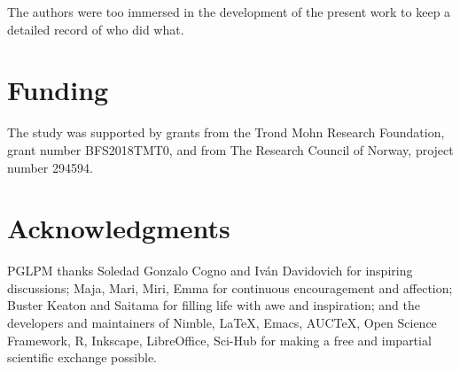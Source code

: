 \documentclass[utf8]{FrontiersinHarvard} %
\providecommand{\href}[2]{#2}
\renewcommand*{\|}[1][]{\nonscript\:#1\vert\nonscript\:\mathopen{}}
\begin{document}
The authors were too immersed in the development of the present work to keep a detailed record of who did what.


\section*{Funding}
The study was supported by grants from the Trond Mohn Research Foundation, grant number BFS2018TMT0, and from The Research Council of Norway, project number 294594.

\section*{Acknowledgments}
PGLPM thanks Soledad Gonzalo Cogno and Iv\'an Davidovich for inspiring discussions;
Maja, Mari, Miri, Emma for continuous encouragement and affection; Buster Keaton and Saitama for filling life with awe and inspiration; and the developers and maintainers of Nimble, \LaTeX, Emacs, AUC\TeX, Open Science Framework, R, Inkscape, LibreOffice, Sci-Hub for making a free and impartial scientific exchange possible.
\end{document}
